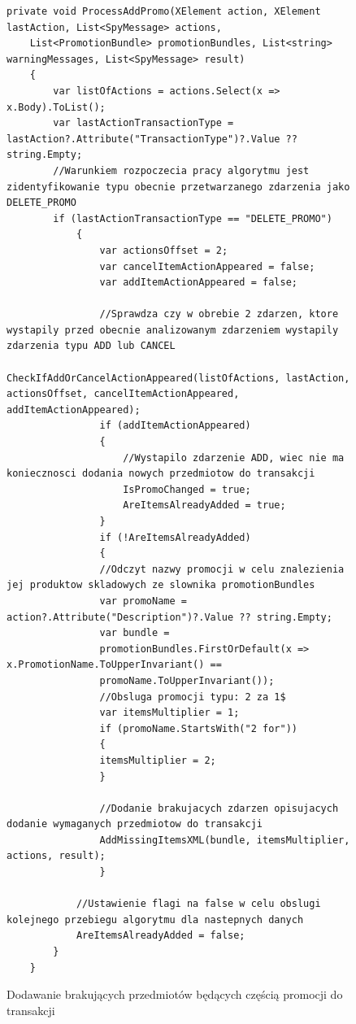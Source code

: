 \documentclass[a4paper]{book}
\begin{document}
\begin{figure}[t]
	\begin{lstlisting}[frame=single, breaklines=true]
	private void ProcessAddPromo(XElement action, XElement lastAction, List<SpyMessage> actions,
	List<PromotionBundle> promotionBundles, List<string> warningMessages, List<SpyMessage> result)
	{
		var listOfActions = actions.Select(x => x.Body).ToList();
		var lastActionTransactionType = lastAction?.Attribute("TransactionType")?.Value ?? string.Empty;
		//Warunkiem rozpoczecia pracy algorytmu jest zidentyfikowanie typu obecnie przetwarzanego zdarzenia jako DELETE_PROMO
		if (lastActionTransactionType == "DELETE_PROMO")
			{
				var actionsOffset = 2;
				var cancelItemActionAppeared = false;
				var addItemActionAppeared = false;
	
				//Sprawdza czy w obrebie 2 zdarzen, ktore wystapily przed obecnie analizowanym zdarzeniem wystapily zdarzenia typu ADD lub CANCEL
				CheckIfAddOrCancelActionAppeared(listOfActions, lastAction, actionsOffset, cancelItemActionAppeared, addItemActionAppeared);
				if (addItemActionAppeared)
				{
					//Wystapilo zdarzenie ADD, wiec nie ma koniecznosci dodania nowych przedmiotow do transakcji
					IsPromoChanged = true;
					AreItemsAlreadyAdded = true;
				}	
				if (!AreItemsAlreadyAdded)
				{
				//Odczyt nazwy promocji w celu znalezienia jej produktow skladowych ze slownika promotionBundles    
				var promoName = action?.Attribute("Description")?.Value ?? string.Empty;
				var bundle =
				promotionBundles.FirstOrDefault(x => x.PromotionName.ToUpperInvariant() ==
				promoName.ToUpperInvariant());
				//Obsluga promocji typu: 2 za 1$
				var itemsMultiplier = 1;
				if (promoName.StartsWith("2 for"))
				{
				itemsMultiplier = 2;
				}
	
				//Dodanie brakujacych zdarzen opisujacych dodanie wymaganych przedmiotow do transakcji
				AddMissingItemsXML(bundle, itemsMultiplier, actions, result);
				}
				
			//Ustawienie flagi na false w celu obslugi kolejnego przebiegu algorytmu dla nastepnych danych
			AreItemsAlreadyAdded = false;
		}
	}
	\end{lstlisting}
	\caption{Dodawanie brakujących przedmiotów będących częścią promocji do transakcji}
	\label{lst:brakujaceProdukty}
\end{figure}
\end{document}
